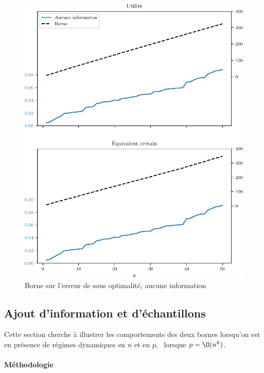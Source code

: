\begin{figure}[h]
  \centering
  \includegraphics[width=\textwidth]{../../experiments/fig/pconst_so_auc.pdf}
  \caption[Borne sur l'erreur de S.O. III]{Borne sur l'erreur de sous optimalité, aucune
    information}
  \label{fig_pconst_so_auc}
\end{figure}

\clearpage

\subsection{Ajout d'information et d'échantillons}
\label{emp:npvar}

Cette section cherche à illustrer les comportements des deux bornes lorsqu'on est en
présence de régimes dynamiques en $n$ et en $p$, \ie\ lorsque $p=\O(n^k)$.

\paragraph{Méthodologie}

